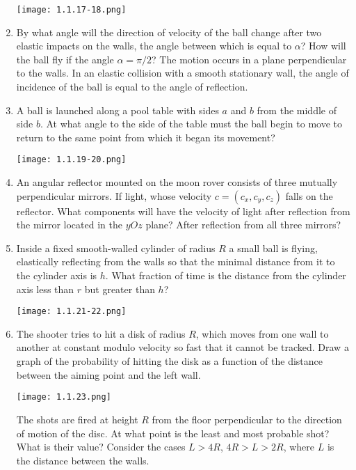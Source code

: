 \documentclass{article}
\begin{document}
\begin{enumerate}[label=1.1.\arabic*]
\begin{center}
    \texttt{[image: 1.1.17-18.png]}
\end{center}



\item By what angle will the direction of velocity of the ball change after two elastic impacts on the walls, the angle between which is equal to $\alpha$? How will the ball fly if the angle $\alpha = \pi/2$? The motion occurs in a plane perpendicular to the walls. In an elastic collision with a smooth stationary wall, the angle of incidence of the ball is equal to the angle of reflection.

\item A ball is launched along a pool table with sides $a$ and $b$ from the middle of side $b$. At what angle to the side of the table must the ball begin to move to return to the same point from which it began its movement?

\begin{center}
    \texttt{[image: 1.1.19-20.png]}
\end{center}

\item An angular reflector mounted on the moon rover consists of three mutually perpendicular mirrors. If light, whose velocity $c = (c_x,c_y,c_z)$ falls on the reflector. What components will have the velocity of light after reflection from the mirror located in the $yOz$ plane? After reflection from all three mirrors?
 
\item Inside a fixed smooth-walled cylinder of radius $R$ a small ball is flying, elastically reflecting from the walls so that the minimal distance from it to the cylinder axis is $h$. What fraction of time is the distance from the cylinder axis less than $r$ but greater than $h$?

\begin{center}
    \texttt{[image: 1.1.21-22.png]}
\end{center}
 
\item The shooter tries to hit a disk of radius $R$, which moves from one wall to another at constant modulo velocity so fast that it cannot be tracked. Draw a graph of the probability of hitting the disk as a function of the distance between the aiming point and the left wall.
\begin{center}
    \texttt{[image: 1.1.23.png]}
\end{center}
The shots are fired at height $R$ from the floor perpendicular to the direction of motion of the disc. At what point is the least and most probable shot? What is their value? Consider the cases $L > 4R$, $4R > L > 2R$, where $L$ is the distance between the walls.
\end{enumerate}
\end{document}
